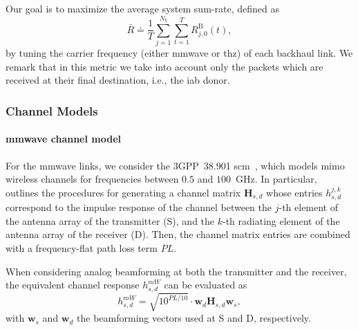 Our goal is to maximize the average system sum-rate, defined as
\begin{equation}
 \bar{R} \doteq \frac{1}{T} \sum_{j = 1}^{N_{\mathrm{I}}} \sum_{t = 1}^{T} R_{j, 0}^{\mathrm{B}} (t),
\end{equation}
%
by tuning the carrier frequency (either \gls{mmwave} or \gls{thz}) of each backhaul link. We remark that in this metric we take into account only the packets which are received at their final destination, i.e., the \gls{iab} donor.

\subsubsection{Channel Models}
\label{sub:channelmodel}
\paragraph{\gls{mmwave} channel model}

For the \gls{mmwave} links, we consider the 3GPP~38.901 \gls{scm}~\cite{3gpp.38.901}, which models \gls{mimo} wireless channels for frequencies between $0.5$ and $100$~GHz.
In particular,~\cite{3gpp.38.901} outlines the procedures for generating a channel matrix $\bm{H}_{s, d}$ whose entries $h_{s, d}^{j, k}$ correspond to the impulse response of the channel between the $j$-th element of the antenna array of the transmitter (S), and the $k$-th radiating element of the antenna array of the receiver (D). %
Then, the channel matrix entries are combined with a frequency-flat path loss term $PL$. 

When considering analog beamforming at both the transmitter and the receiver, the equivalent channel response $h_{s, d}^{mW}$ can be evaluated as
\begin{equation}
\label{eq:sinr}
    h_{s, d}^{mW} = \sqrt{10^{PL/10}} \cdot \bm{w}_{d} \bm{H}_{s, d} \bm{w}_{s},
\end{equation}
%
with $\bm{w}_{s}$ and $\bm{w}_{d}$ the beamforming vectors used at S and D, respectively.

